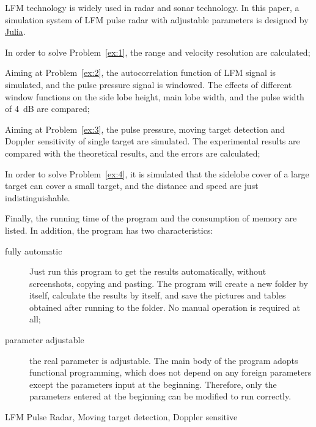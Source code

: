 \documentclass[../main]{subfiles}
\begin{document}
\begin{abstract*}
  LFM technology is widely used in radar and sonar technology. In this paper,
  a simulation system of LFM pulse radar with adjustable parameters is
  designed by
  \href{https://github.com/JuliaLang/julia}{Julia}.\cite{FFTW.jl-2005}

  In order to solve Problem~\ref{ex:1}, the range and velocity resolution are calculated;

  Aiming at Problem~\ref{ex:2}, the autocorrelation function of LFM signal is
  simulated, and the pulse pressure signal is windowed. The effects of
  different window functions on the side lobe height, main lobe width, and
  the pulse width of \SI{4}{\dB} are compared;

  Aiming at Problem~\ref{ex:3}, the pulse pressure, moving target detection
  and Doppler sensitivity of single target are simulated. The experimental
  results are compared with the theoretical results, and the errors are
  calculated;

  In order to solve Problem~\ref{ex:4}, it is simulated that the sidelobe
  cover of a large target can cover a small target, and the distance and
  speed are just indistinguishable.

  Finally, the running time of the program and the consumption of memory are
  listed. In addition, the program has two characteristics:

  \begin{description}
    \item[fully automatic]Just run this program to get the results
      automatically, without screenshots, copying and pasting. The program
      will create a new folder by itself, calculate the results by itself,
      and save the pictures and tables obtained after running to the folder.
      No manual operation is required at all;
    \item[parameter adjustable] the real parameter is adjustable. The main
      body of the program adopts functional programming, which does not
      depend on any foreign parameters except the parameters input at the
      beginning. Therefore, only the parameters entered at the beginning can
      be modified to run correctly.
  \end{description} 
  \begin{keyword*}
    LFM Pulse Radar, Moving target detection, Doppler sensitive
  \end{keyword*}
\end{abstract*}
\end{document}
